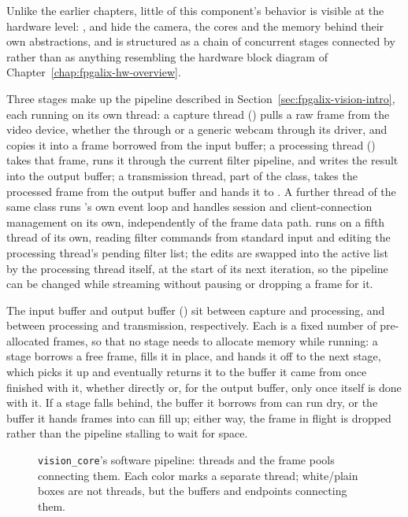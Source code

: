 Unlike the earlier chapters, little of this component's behavior is visible at the hardware level: ,  and  hide the camera, the  cores and the memory behind their own abstractions, and  is structured as a chain of concurrent stages connected by  rather than as anything resembling the hardware block diagram of Chapter~\ref{chap:fpgalix-hw-overview}.

Three stages make up the pipeline described in Section~\ref{sec:fpgalix-vision-intro}, each running on its own thread: a capture thread () pulls a raw frame from the video device, whether the  through  or a generic webcam through its driver, and copies it into a frame borrowed from the input buffer; a processing thread () takes that frame, runs it through the current filter pipeline, and writes the result into the output buffer; a transmission thread, part of the  class, takes the processed frame from the output buffer and hands it to . A further thread of the same class runs 's own event loop and handles  session and client-connection management on its own, independently of the frame data path.  runs on a fifth thread of its own, reading filter commands from standard input and editing the processing thread's pending filter list; the edits are swapped into the active list by the processing thread itself, at the start of its next iteration, so the pipeline can be changed while streaming without pausing or dropping a frame for it.

The input buffer and output buffer () sit between capture and processing, and between processing and transmission, respectively. Each is a fixed number of pre-allocated frames, so that no stage needs to allocate memory while running: a stage borrows a free frame, fills it in place, and hands it off to the next stage, which picks it up and eventually returns it to the buffer it came from once finished with it, whether directly or, for the output buffer, only once  itself is done with it. If a stage falls behind, the buffer it borrows from can run dry, or the buffer it hands frames into can fill up; either way, the frame in flight is dropped rather than the pipeline stalling to wait for space.

\begin{landscape}
\begin{figure}[p]
    \centering
    
    \caption{\texttt{vision\_core}'s software pipeline: threads and the frame pools connecting them. Each color marks a separate thread; white/plain boxes are not threads, but the buffers and endpoints connecting them.}
    \label{fig:fpgalix-vision-pipeline}
\end{figure}
\end{landscape}

